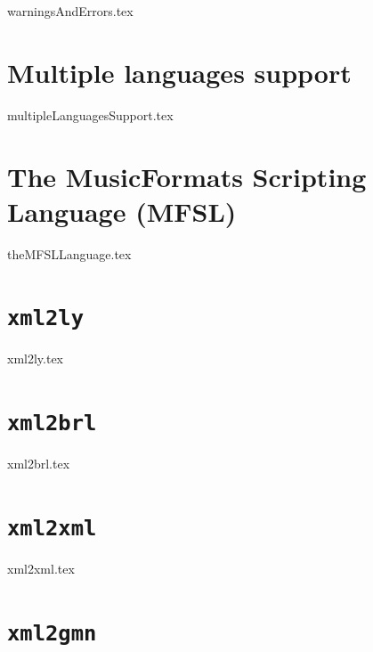 \documentclass[11pt,a4paper]{report}
\begin{document}
{warningsAndErrors.tex}


\part{Multiple languages support}

{multipleLanguagesSupport.tex}


\part{The MusicFormats Scripting Language (MFSL)}

{theMFSLLanguage.tex}


\part{{\tt xml2ly}}

{xml2ly.tex}


\part{{\tt xml2brl}}

{xml2brl.tex}


\part{{\tt xml2xml}}

{xml2xml.tex}


\part{{\tt xml2gmn}}
\end{document}
